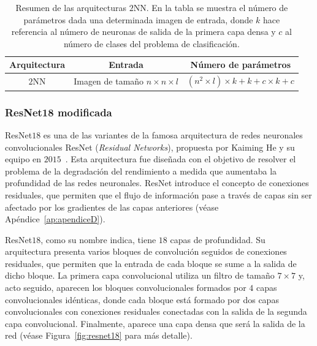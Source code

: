 \begin{table}[ht]
    \centering
    \renewcommand{\arraystretch}{1.5} 
    \begin{tabular}{|c|c|c|}
    \hline
    \textbf{Arquitectura}          & \textbf{Entrada}                                   & \textbf{Número de parámetros}                     \\ \hline
    $2$NN                & Imagen de tamaño $n \times n \times l$                & $(n^2 \times l) \times k + k + c \times k + c$                                             \\ \hline
    \end{tabular}
    \caption[Resumen de las arquitecturas $2$NN.]{Resumen de las arquitecturas $2$NN. En la tabla se muestra el número de parámetros dada una determinada imagen de entrada, donde $k$ hace referencia al número de neuronas de salida de la primera capa densa y $c$ al número de clases del problema de clasificación.}\label{tab:numero-parametros}
\end{table}

\subsubsection{ResNet18 modificada}\label{subsubsec:resnet18-modificada}

ResNet$18$ es una de las variantes de la famosa arquitectura de redes neuronales convolucionales ResNet (\textit{Residual Networks}), propuesta por Kaiming He y su equipo en $2015$~\cite{He2015}. Esta arquitectura fue diseñada con el objetivo de resolver el problema de la degradación del rendimiento a medida que aumentaba la profundidad de las redes neuronales. ResNet introduce el concepto de conexiones residuales, que permiten que el flujo de información pase a través de capas sin ser afectado por los gradientes de las capas anteriores (véase Apéndice~\ref{ap:apendiceD}).

ResNet$18$, como su nombre indica, tiene $18$ capas de profundidad. Su arquitectura presenta varios bloques de convolución seguidos de conexiones residuales, que permiten que la entrada de cada bloque se sume a la salida de dicho bloque. La primera capa convolucional utiliza un filtro de tamaño $7 \times 7$ y, acto seguido, aparecen los bloques convolucionales formados por $4$ capas convolucionales idénticas, donde cada bloque está formado por dos capas convolucionales con conexiones residuales conectadas con la salida de la segunda capa convolucional. Finalmente, aparece una capa densa que será la salida de la red (véase Figura~\ref{fig:resnet18} para más detalle).

